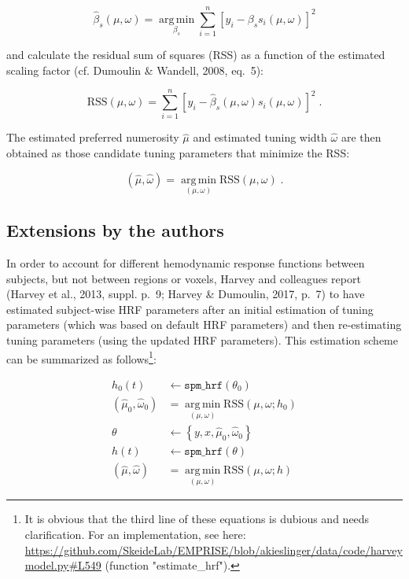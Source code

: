 \documentclass[a4paper,12pt]{article}
\begin{document}
\begin{equation} \label{eq:bs-est}
\hat{\beta}_s(\mu,\omega) = \operatorname*{arg\,min}_{\beta_s} \sum_{i=1}^{n} \left[ y_i - \beta_s s_i(\mu,\omega) \right]^2
\end{equation}

and calculate the residual sum of squares (RSS) as a function of the estimated scaling factor (cf. Dumoulin \& Wandell, 2008, eq.~5):

\begin{equation} \label{eq:RSS}
\mathrm{RSS}(\mu,\omega) = \sum_{i=1}^{n} \left[ y_i - \hat{\beta}_s(\mu,\omega) s_i(\mu,\omega) \right]^2 \; .
\end{equation}

The estimated preferred numerosity $\hat{\mu}$ and estimated tuning width $\hat{\omega}$ are then obtained as those candidate tuning parameters that minimize the RSS:

\begin{equation} \label{eq:mu-tw-est}
(\hat{\mu},\hat{\omega}) = \operatorname*{arg\,min}_{(\mu,\omega)} \mathrm{RSS}(\mu,\omega) \; .
\end{equation}


\subsection{Extensions by the authors}

In order to account for different hemodynamic response functions between subjects, but not between regions or voxels, Harvey and colleagues report (Harvey et al., 2013, suppl. p.~9; Harvey \& Dumoulin, 2017, p.~7) to have estimated subject-wise HRF parameters after an initial estimation of tuning parameters (which was based on default HRF parameters) and then re-estimating tuning parameters (using the updated HRF parameters). This estimation scheme can be summarized as follows\footnote{It is obvious that the third line of these equations is dubious and needs clarification. For an implementation, see here: \url{https://github.com/SkeideLab/EMPRISE/blob/akieslinger/data/code/harveymodel.py#L549} (function "estimate\_hrf").}:

\begin{equation} \label{eq:Harvey}
\begin{split}
h_0(t) &\leftarrow \mathtt{spm\_hrf}(\theta_0) \\
(\hat{\mu}_0,\hat{\omega}_0) &= \operatorname*{arg\,min}_{(\mu,\omega)} \mathrm{RSS}(\mu,\omega;h_0) \\
\theta &\leftarrow \left\lbrace y, x, \hat{\mu}_0, \hat{\omega}_0 \right\rbrace \\
h(t) &\leftarrow \mathtt{spm\_hrf}(\theta) \\
(\hat{\mu},\hat{\omega}) &= \operatorname*{arg\,min}_{(\mu,\omega)} \mathrm{RSS}(\mu,\omega;h)
\end{split}
\end{equation}
\end{document}

